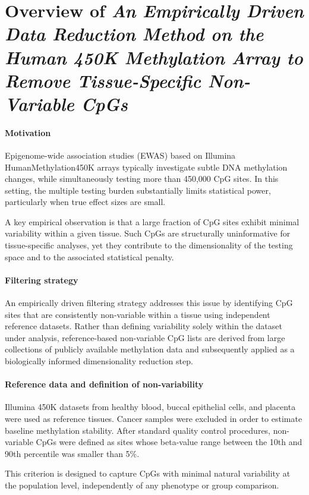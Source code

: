 \documentclass[10pt]{extarticle}
\begin{document}
\section{Overview of \textit{An Empirically Driven Data Reduction Method on the Human 450K Methylation Array to Remove Tissue-Specific Non-Variable CpGs} \cite{Edgar2017}}

\paragraph{Motivation}
Epigenome-wide association studies (EWAS) based on Illumina HumanMethylation450K arrays typically investigate subtle DNA methylation changes, while simultaneously testing more than 450,000 CpG sites. In this setting, the multiple testing burden substantially limits statistical power, particularly when true effect sizes are small.

A key empirical observation is that a large fraction of CpG sites exhibit minimal variability within a given tissue. Such CpGs are structurally uninformative for tissue-specific analyses, yet they contribute to the dimensionality of the testing space and to the associated statistical penalty.

\paragraph{Filtering strategy}
An empirically driven filtering strategy addresses this issue by identifying CpG sites that are consistently non-variable within a tissue using independent reference datasets. Rather than defining variability solely within the dataset under analysis, reference-based non-variable CpG lists are derived from large collections of publicly available methylation data and subsequently applied as a biologically informed dimensionality reduction step.

\paragraph{Reference data and definition of non-variability}
Illumina 450K datasets from healthy blood, buccal epithelial cells, and placenta were used as reference tissues. Cancer samples were excluded in order to estimate baseline methylation stability. After standard quality control procedures, non-variable CpGs were defined as sites whose beta-value range between the 10th and 90th percentile was smaller than 5\%.

This criterion is designed to capture CpGs with minimal natural variability at the population level, independently of any phenotype or group comparison.
\end{document}
